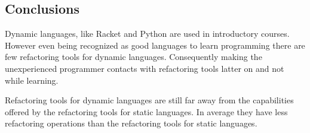 

\subsection{Conclusions}







Dynamic languages, like Racket and Python are used in introductory courses. 
However even being recognized as good languages to learn programming there are few refactoring tools for dynamic languages. 
Consequently making the unexperienced programmer contacts with refactoring tools latter on and not while learning.

Refactoring tools for dynamic languages are still far away from the capabilities offered by the refactoring tools for static languages. 
In average they have less refactoring operations than the refactoring tools for static languages.

